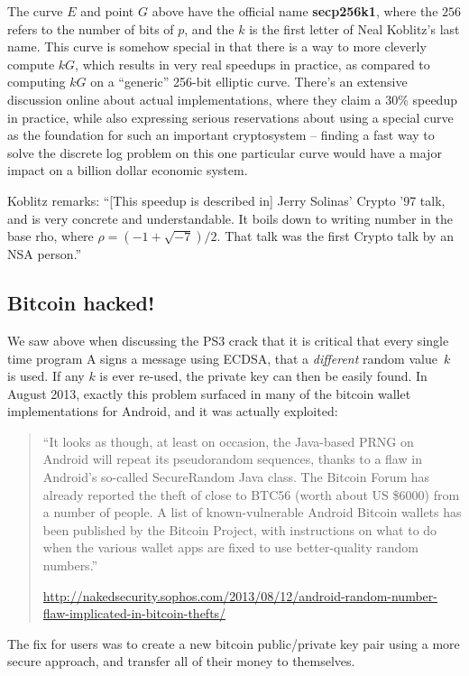 \documentclass{book}
\begin{document}
The curve $E$ and point $G$ above have the official name {\bf secp256k1}, where the
$256$ refers to the number of bits of $p$, and the $k$ is the first
letter of Neal Koblitz's last name.
This curve is somehow special in that there is a way to more cleverly compute
$kG$, which results in very real speedups in practice, as compared
to computing $kG$ on a ``generic'' 256-bit elliptic curve.  There's
an extensive discussion online about actual implementations, where
they claim a 30\% speedup in practice, while also expressing serious
reservations about using a special curve as the foundation for such
an important cryptosystem -- finding a fast way to solve the discrete
log problem on this one particular curve would have a major impact
on a billion dollar economic system.

Koblitz remarks:  ``[This speedup is described in]
Jerry Solinas' Crypto '97 talk, and is very concrete
and understandable.  It boils down to writing number in the base rho,
where $\rho=(-1+\sqrt{-7})/2$.  That talk was the first Crypto talk by an
NSA person.''


\subsection{Bitcoin hacked!}
We saw above when discussing the PS3 crack that
it is critical that every single time program A signs a message
using ECDSA, that a {\em different} random value~$k$ is used.
If any $k$ is ever re-used, the private key can then be easily found.
In August 2013, exactly this problem surfaced in many of the bitcoin wallet
implementations for Android, and it was actually exploited:
\begin{quote}
``It looks as though, at least on occasion, the Java-based PRNG on Android will repeat its pseudorandom sequences, thanks to a flaw in Android's so-called SecureRandom Java class.  The Bitcoin Forum has already reported the theft of close to BTC56 (worth about US \$6000) from a number of people. A list of known-vulnerable Android Bitcoin wallets has been published by the Bitcoin Project, with instructions on what to do when the various wallet apps are fixed to use better-quality random numbers.''

\url{http://nakedsecurity.sophos.com/2013/08/12/android-random-number-flaw-implicated-in-bitcoin-thefts/}
\end{quote}

The fix for users was to create a new bitcoin public/private key pair using
a more secure approach, and transfer all of their money to themselves.
\end{document}
